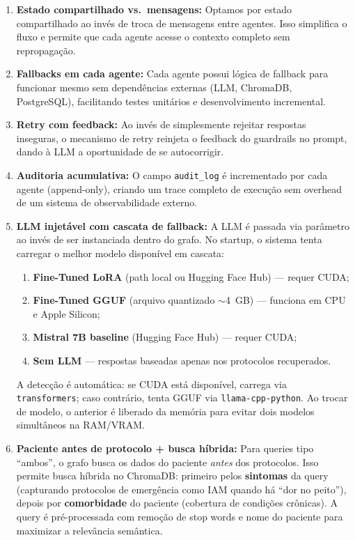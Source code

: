 \begin{enumerate}
    \item \textbf{Estado compartilhado vs.\ mensagens:} Optamos por estado compartilhado ao invés de troca de mensagens entre agentes. Isso simplifica o fluxo e permite que cada agente acesse o contexto completo sem repropagação.

    \item \textbf{Fallbacks em cada agente:} Cada agente possui lógica de fallback para funcionar mesmo sem dependências externas (LLM, ChromaDB, PostgreSQL), facilitando testes unitários e desenvolvimento incremental.

    \item \textbf{Retry com feedback:} Ao invés de simplesmente rejeitar respostas inseguras, o mecanismo de retry reinjeta o feedback do guardrails no prompt, dando à LLM a oportunidade de se autocorrigir.

    \item \textbf{Auditoria acumulativa:} O campo \texttt{audit\_log} é incrementado por cada agente (append-only), criando um trace completo de execução sem overhead de um sistema de observabilidade externo.

    \item \textbf{LLM injetável com cascata de fallback:} A LLM é passada via parâmetro ao invés de ser instanciada dentro do grafo. No startup, o sistema tenta carregar o melhor modelo disponível em cascata:

    \begin{enumerate}
        \item \textbf{Fine-Tuned LoRA} (path local ou Hugging Face Hub) --- requer CUDA;
        \item \textbf{Fine-Tuned GGUF} (arquivo quantizado $\sim$4~GB) --- funciona em CPU e Apple Silicon;
        \item \textbf{Mistral 7B baseline} (Hugging Face Hub) --- requer CUDA;
        \item \textbf{Sem LLM} --- respostas baseadas apenas nos protocolos recuperados.
    \end{enumerate}

    A detecção é automática: se CUDA está disponível, carrega via \texttt{transformers}; caso contrário, tenta GGUF via \texttt{llama-cpp-python}. Ao trocar de modelo, o anterior é liberado da memória para evitar dois modelos simultâneos na RAM/VRAM.

    \item \textbf{Paciente antes de protocolo + busca híbrida:} Para queries tipo ``ambos'', o grafo busca os dados do paciente \emph{antes} dos protocolos. Isso permite busca híbrida no ChromaDB: primeiro pelos \textbf{sintomas} da query (capturando protocolos de emergência como IAM quando há ``dor no peito''), depois por \textbf{comorbidade} do paciente (cobertura de condições crônicas). A query é pré-processada com remoção de stop words e nome do paciente para maximizar a relevância semântica.
\end{enumerate}

